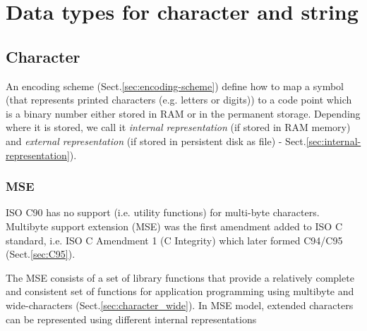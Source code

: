 \chapter{Data types for character and string}
\label{chap:string}

\section{Character}
\label{sec:character}

An encoding scheme (Sect.\ref{sec:encoding-scheme}) define how to map a symbol
(that represents printed characters (e.g. letters or digits)) to a code point
which is a binary number either stored in RAM or in the permanent storage.
Depending where it is stored, we call it {\it internal representation} (if
stored in RAM memory) and {\it external representation} (if stored in persistent
disk as file) - Sect.\ref{sec:internal-representation}).





\subsection{MSE}
\label{sec:MSE}

ISO C90 has no support (i.e. utility functions) for multi-byte characters.
Multibyte support extension (MSE) was the first amendment added to ISO C
standard, i.e. ISO C Amendment 1 (C Integrity) which later formed C94/C95
(Sect.\ref{sec:C95}).

The MSE consists of a set of library functions that provide a relatively
complete and consistent set of functions for application programming using
multibyte and wide-characters (Sect.\ref{sec:character_wide}). In MSE model,
extended characters can be represented using different internal representations


